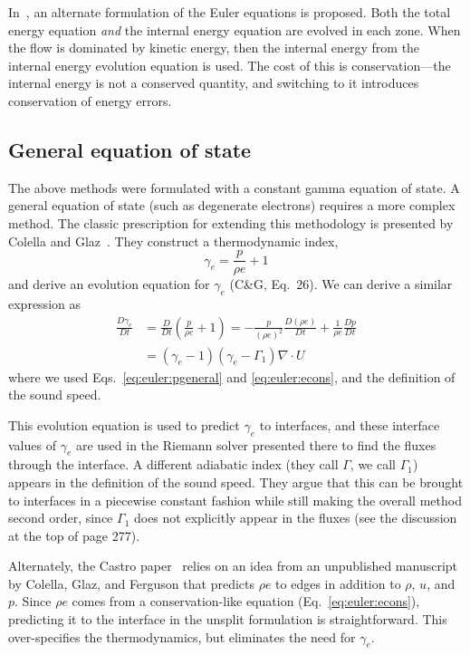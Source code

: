   In~\cite{bryan:1995}, an alternate formulation of the Euler equations
  is proposed.  Both the total energy equation {\em and} the internal
  energy equation are evolved in each zone.  When the flow is dominated
  by kinetic energy, then the internal energy from the internal energy
  evolution equation is used.  The cost of this is conservation---the
  internal energy is not a conserved quantity, and switching to it
  introduces conservation of energy errors.

\subsection{General equation of state}

The above methods were formulated
with a constant gamma equation of state.  A general equation of state
(such as degenerate electrons) requires a more complex method.  The classic
prescription for extending this methodology is presented by Colella and
Glaz~\cite{colellaglaz:1985}.  They construct a thermodynamic index,
\begin{equation}
\gamma_e = \frac{p}{\rho e} + 1
\end{equation}
and derive an evolution equation for $\gamma_e$ (C\&G, Eq.\ 26).
We can derive a similar expression as
\begin{align}
\frac{D\gamma_e}{Dt} &= \frac{D}{Dt} \left ( \frac{p}{\rho e} + 1 \right )
   = - \frac{p}{(\rho e)^2} \frac{D(\rho e)}{Dt} + \frac{1}{\rho e} \frac{Dp}{Dt} \nonumber \\
   &= (\gamma_e - 1) (\gamma_e  - \Gamma_1) \nabla \cdot U \label{eq:gammae}
\end{align}
where we used Eqs.~\ref{eq:euler:pgeneral} and \ref{eq:euler:econs}, and the definition
of the sound speed.

This evolution equation is used to predict $\gamma_e$ to interfaces,
and these interface values of $\gamma_e$ are used in the Riemann
solver presented there to find the fluxes through the interface.  A
different adiabatic index (they call $\Gamma$, we call $\Gamma_1$)
appears in the definition of the sound speed.  They argue that this
can be brought to interfaces in a piecewise constant fashion while
still making the overall method second order, since $\Gamma_1$ does
not explicitly appear in the fluxes (see the discussion at the top of
page 277).

Alternately, the Castro paper~\cite{almgren:2010} relies on an idea
from an unpublished manuscript by Colella, Glaz, and Ferguson that
predicts $\rho e$ to edges in addition to $\rho$, $u$, and $p$.  Since
$\rho e$ comes from a conservation-like equation
(Eq.~\ref{eq:euler:econs}), predicting it to the interface in the
unsplit formulation is straightforward.  This over-specifies the
thermodynamics, but eliminates the need for $\gamma_e$.


